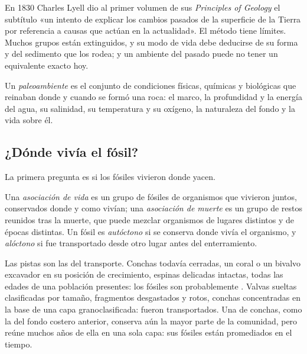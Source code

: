En 1830 Charles Lyell dio al primer volumen de sus \emph{Principles of Geology} el subtítulo «un
intento de explicar los cambios pasados de la superficie de la Tierra por referencia a causas que actúan
en la actualidad». El método tiene límites. Muchos grupos están extinguidos, y su modo de vida debe
deducirse de su forma y del sedimento que los rodea; y un ambiente del pasado puede
no tener un equivalente exacto hoy.

\begin{definition}[Paleoambiente]\label{def:b2:palaeoenvironments:palaeoenvironment}
Un \emph{paleoambiente} es el conjunto de condiciones físicas, químicas y
biológicas que reinaban donde y cuando se formó una roca: el marco, la profundidad y la
energía del agua, su salinidad, su temperatura y su oxígeno, la naturaleza del fondo y la vida
sobre él.
\end{definition}

\subsection*{¿Dónde vivía el fósil?}

La primera pregunta es si los fósiles vivieron donde yacen.

\begin{definition}\label{def:b2:palaeoenvironments:assemblages}
Una \emph{asociación de vida} es un grupo de fósiles de organismos que vivieron
juntos, conservados donde y como vivían; una \emph{asociación de muerte} es
un grupo de restos reunidos tras la muerte, que puede mezclar organismos de lugares distintos
y de épocas distintas. Un fósil es \emph{autóctono} si se
conserva donde vivía el organismo, y \emph{alóctono} si fue
transportado desde otro lugar antes del enterramiento.
\end{definition}

Las pistas son las del transporte. Conchas todavía cerradas, un coral o un bivalvo excavador en su
posición de crecimiento, espinas delicadas intactas, todas las edades de una población presentes: los fósiles son
probablemente . Valvas sueltas clasificadas por tamaño, fragmentos desgastados y rotos, conchas
concentradas en la base de una capa granoclasificada: fueron transportados. Una  de conchas, como
la del fondo costero anterior, conserva aún la mayor parte de la comunidad, pero reúne muchos años
de ella en una sola capa: sus fósiles están promediados en el tiempo.

